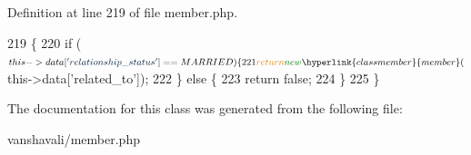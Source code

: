 Definition at line 219 of file member.\-php.


\begin{DoxyCode}
219                       \{
220         \textcolor{keywordflow}{if} ($this->data[\textcolor{stringliteral}{'relationship\_status'}] == MARRIED) \{
221             \textcolor{keywordflow}{return} \textcolor{keyword}{new} \hyperlink{classmember}{member}($this->data[\textcolor{stringliteral}{'related\_to'}]);
222         \} \textcolor{keywordflow}{else} \{
223             \textcolor{keywordflow}{return} \textcolor{keyword}{false};
224         \}
225     \}
\end{DoxyCode}


The documentation for this class was generated from the following file\-:\begin{DoxyCompactItemize}
\item 
vanshavali/member.\-php\end{DoxyCompactItemize}
